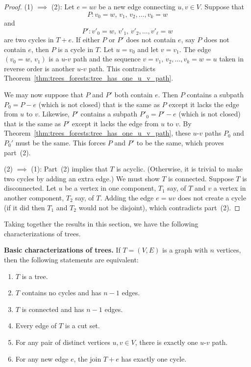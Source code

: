 \begin{proof}
(1) $\implies$ (2):
Let $e = uv$ be a new edge connecting $u,v \in V$. Suppose that
\[
P : v_0 = w,\, v_1,\, v_2, \dots, v_k = w
\]
and
\[
P' : v'_0 = w,\, v'_1,\, v'_2, \dots, v'_\ell = w
\]
are two cycles in $T + e$. If either $P$ or $P'$ does not contain $e$,
say $P$ does not contain $e$, then $P$ is a cycle in $T$. Let
$u = v_0$ and let $v = v_1$. The edge $(v_0 = w,\, v_1)$ is a $u$-$v$
path and the sequence $v = v_1,\, v_2, \dots, v_k = w = u$ taken in
reverse order is another $u$-$v$ path. This contradicts
Theorem~\ref{thm:trees_forests:tree_has_one_u_v_path}.

We may now suppose that $P$ and $P'$ both contain $e$. Then $P$
contains a subpath $P_0 = P - e$ (which is not closed) that is the
same as $P$ except it lacks the edge from $u$ to $v$. Likewise, $P'$
contains a subpath $P'_0=P'-e$ (which is not closed) that is the same
as $P'$ except it lacks the edge from $u$ to $v$. By
Theorem~\ref{thm:trees_forests:tree_has_one_u_v_path}, these $u$-$v$
paths $P_0$ and $P_0'$ must be the same. This forces $P$ and $P'$ to
be the same, which proves part~(2).

(2) $\implies$ (1):
Part~(2) implies that $T$ is acyclic. (Otherwise, it is trivial
to make two cycles by adding an extra edge.) We must show $T$ is
connected. Suppose $T$ is disconnected. Let $u$ be a vertex in one
component, $T_1$ say, of $T$ and $v$ a vertex in another component,
$T_2$ say, of $T$. Adding the edge $e = uv$ does not create a cycle
(if it did then $T_1$ and $T_2$ would not be disjoint), which
contradicts part~(2).
\end{proof}

Taking together the results in this section, we have the following
characterizations of trees.

\begin{theorem}
\label{thm:trees_forests:basic_characterizations_of_trees}
\textbf{Basic characterizations of trees.}
If $T = (V, E)$ is a graph with $n$ vertices, then the following
statements are equivalent:
\begin{enumerate}
\item $T$ is a tree.

\item $T$ contains no cycles and has $n - 1$ edges.

\item $T$ is connected and has $n - 1$ edges.

\item Every edge of $T$ is a cut set.

\item For any pair of distinct vertices $u,v \in V$, there is exactly
  one $u$-$v$ path.

\item For any new edge $e$, the join $T + e$ has exactly one cycle.
\end{enumerate}
\end{theorem}

